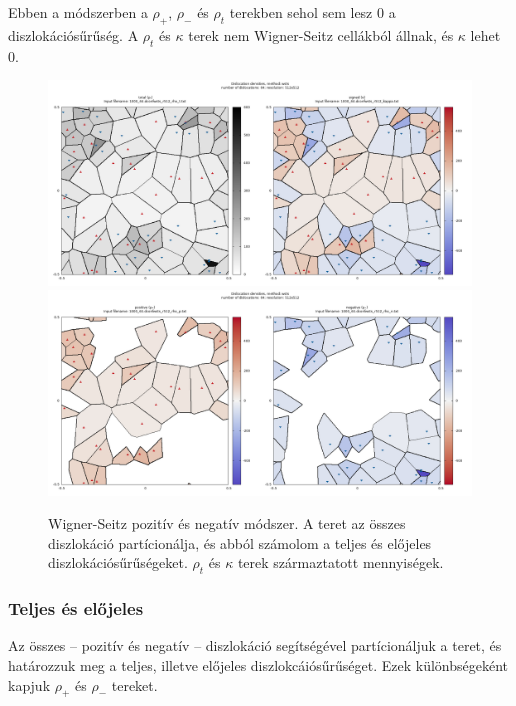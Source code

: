 \documentclass[10pt,a4paper]{scrartcl}
\begin{document}
Ebben a módszerben a $\rho_+$, $\rho_-$ és $\rho_t$ terekben sehol sem lesz 0 a diszlokációsűrűség. A $\rho_t$ és $\kappa$ terek nem Wigner-Seitz cellákból állnak, és $\kappa$ lehet 0.

\begin{center}
\begin{figure}
\includegraphics[width=\textwidth]{"../xautocorr/example_with_64_dislocations/1000_64.dconfwsts_r512_ts.txt"}
\includegraphics[width=\textwidth]{"../xautocorr/example_with_64_dislocations/1000_64.dconfwsts_r512_pn.txt"}
\caption{Wigner-Seitz pozitív és negatív módszer. A teret az összes diszlokáció partícionálja, és abból számolom a teljes és előjeles diszlokációsűrűségeket. $\rho_t$ és $\kappa$ terek származtatott mennyiségek.}
\end{figure}
\end{center}

\subsubsection{Teljes és előjeles}
Az összes -- pozitív és negatív -- diszlokáció segítségével partícionáljuk a teret, és határozzuk meg a teljes, illetve előjeles diszlokcáiósűrűséget. Ezek különbségeként kapjuk $\rho_+$ és $\rho_-$ tereket.
\end{document}
